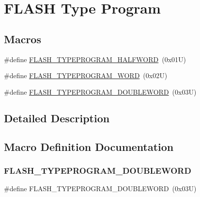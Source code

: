 \hypertarget{group___f_l_a_s_h___type___program}{}\section{F\+L\+A\+SH Type Program}
\label{group___f_l_a_s_h___type___program}
\subsection*{Macros}
\begin{DoxyCompactItemize}
\item 
\#define \hyperlink{group___f_l_a_s_h___type___program_ga2b607dfc2efd463a8530e327bc755582}{F\+L\+A\+S\+H\+\_\+\+T\+Y\+P\+E\+P\+R\+O\+G\+R\+A\+M\+\_\+\+H\+A\+L\+F\+W\+O\+RD}~(0x01\+U)
\item 
\#define \hyperlink{group___f_l_a_s_h___type___program_gadd25c6821539030ba6711e7c0d586c3e}{F\+L\+A\+S\+H\+\_\+\+T\+Y\+P\+E\+P\+R\+O\+G\+R\+A\+M\+\_\+\+W\+O\+RD}~(0x02\+U)
\item 
\#define \hyperlink{group___f_l_a_s_h___type___program_gabdc2b0b4d2e66c2be90fafbfbf1e225f}{F\+L\+A\+S\+H\+\_\+\+T\+Y\+P\+E\+P\+R\+O\+G\+R\+A\+M\+\_\+\+D\+O\+U\+B\+L\+E\+W\+O\+RD}~(0x03\+U)
\end{DoxyCompactItemize}


\subsection{Detailed Description}


\subsection{Macro Definition Documentation}
\mbox{\label{group___f_l_a_s_h___type___program_gabdc2b0b4d2e66c2be90fafbfbf1e225f}} 
\subsubsection{\texorpdfstring{F\+L\+A\+S\+H\+\_\+\+T\+Y\+P\+E\+P\+R\+O\+G\+R\+A\+M\+\_\+\+D\+O\+U\+B\+L\+E\+W\+O\+RD}{FLASH\_TYPEPROGRAM\_DOUBLEWORD}}
{\footnotesize\ttfamily \#define F\+L\+A\+S\+H\+\_\+\+T\+Y\+P\+E\+P\+R\+O\+G\+R\+A\+M\+\_\+\+D\+O\+U\+B\+L\+E\+W\+O\+RD~(0x03\+U)}

